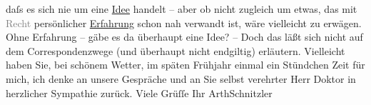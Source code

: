 \begin{ledgroupsized}[t]{13cm}
                    daſs es sich nie um eine \uline{Idee} handelt – aber ob
                    nicht zugleich um etwas, das mit \textcolor{gray}{Recht} persönlicher \uline{Erfahrung} schon nah verwandt ist, wäre
                    vielleicht zu erwägen. Ohne Erfahrung – gäbe es da{\geminationn}
                    überhaupt eine Idee? – Doch das läßt {\pb}sich nicht auf dem
                    Correspondenzwege (und überhaupt nicht endgiltig) erläutern. Vielleicht haben
                    Sie, bei schönem Wetter, im späten Frühjahr einmal ein Stündchen Zeit für mich,
                    ich denke an unsere Gespräche und an Sie selbst verehrter Herr Doktor in
                    herzlicher Sympathie zurück.\pend
           \pstart Viele Grüſſe Ihr \spacefill\mbox{ArthSchnitzler}\pend{}\endnumbering{}\end{ledgroupsized}  \newcommand{\dateiname}{L02484}\newcommand{\titel}{Arthur Schnitzler an Robert Adam, 9. 4. 1927}\newcommand{\editorInnen}{Martin Anton Müller und Gerd-Hermann Susen}
      